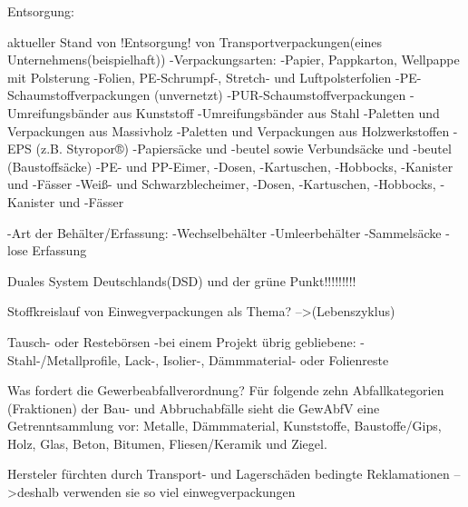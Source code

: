 Entsorgung:

    aktueller Stand von !Entsorgung! von Transportverpackungen(eines Unternehmens(beispielhaft))
        -Verpackungsarten:  -Papier, Pappkarton, Wellpappe mit Polsterung
                            -Folien, PE-Schrumpf-, Stretch- und Luftpolsterfolien
                            -PE-Schaumstoffverpackungen (unvernetzt)
                            -PUR-Schaumstoffverpackungen
                            -Umreifungsbänder aus Kunststoff
                            -Umreifungsbänder aus Stahl
                            -Paletten und Verpackungen aus Massivholz
                            -Paletten und Verpackungen aus Holzwerkstoffen
                            -EPS (z.B. Styropor®)
                            -Papiersäcke und -beutel sowie Verbundsäcke und -beutel (Baustoffsäcke)
                            -PE- und PP-Eimer, -Dosen, -Kartuschen, -Hobbocks, -Kanister und -Fässer
                            -Weiß- und Schwarzblecheimer, -Dosen, -Kartuschen, -Hobbocks, -Kanister und -Fässer

        -Art der Behälter/Erfassung:
                            -Wechselbehälter
                            -Umleerbehälter
                            -Sammelsäcke
                            -lose Erfassung


Duales System Deutschlands(DSD) und der grüne Punkt!!!!!!!!!




Stoffkreislauf von Einwegverpackungen als Thema?
    -->(Lebenszyklus)




Tausch- oder Restebörsen
    -bei einem Projekt übrig gebliebene:
        -Stahl-/Metallprofile, Lack-, Isolier-, Dämmmaterial- oder Folienreste
        
Was fordert die Gewerbeabfallverordnung? 
    Für folgende zehn Abfallkategorien (Fraktionen) der Bau- und Abbruchabfälle sieht die GewAbfV eine Getrenntsammlung vor: Metalle, Dämmmaterial, Kunststoffe, Baustoffe/Gips, Holz, Glas, Beton, Bitumen, Fliesen/Keramik und Ziegel. 

Hersteler fürchten durch Transport- und Lagerschäden bedingte Reklamationen
    -->deshalb verwenden sie so viel einwegverpackungen
    
